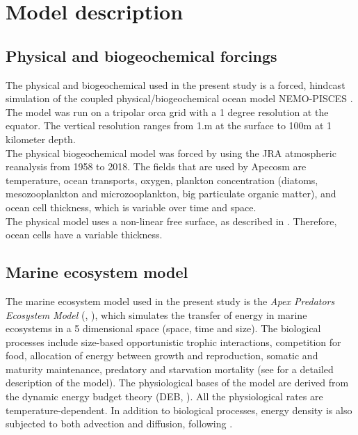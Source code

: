 \section{Model description}

\subsection{Physical and biogeochemical forcings}

The physical and biogeochemical used in the present study is a forced, hindcast simulation of the coupled physical/biogeochemical 
ocean model NEMO-PISCES \citep{aumontPISCESv2OceanBiogeochemical2015}. The model was run on a tripolar orca grid \citep{madecGlobalOceanMesh1996} with a
1 degree resolution at the equator. The vertical resolution ranges from 1.m at the surface to 100m at 1 kilometer depth. \\

The physical biogeochemical model was forced by using the JRA atmospheric reanalysis \citep{kobayashiJRA55ReanalysisGeneral2015} from 1958 to 2018.
The fields that are used by Apecosm are temperature, ocean transports, 
oxygen, plankton concentration (diatoms, mesozooplankton and microzooplankton, big particulate organic matter), 
\ppar and ocean cell thickness, which is variable over time and space.\\

The physical model uses a non-linear free surface, as described in \cite{levierbrunoFreeSurfaceVariable2007}. 
Therefore, ocean cells have a variable thickness. 

\subsection{Marine ecosystem model}

The marine ecosystem model used in the present study is the \emph{Apex Predators Ecosystem Model} (\ap, \citealt{mauryModelingEnvironmentalEffects2007,mauryOverviewAPECOSMSpatialized2010}), which simulates 
the transfer of energy in marine ecosystems in a 5 dimensional space (space, time and size).
The biological processes include size-based opportunistic trophic interactions, competition for food, allocation of energy between growth and reproduction, somatic and maturity maintenance, predatory and starvation mortality (see \citealt{mauryModelingEnvironmentalEffects2007} for a detailed description of the model).
The physiological bases of the model are derived from the dynamic energy budget theory (DEB, \citealt{kooijmanDynamicEnergyMass2000}).
All the physiological rates are temperature-dependent.  In addition to biological processes, energy density 
is also subjected to both advection and diffusion, following \cite{faugerasAdvectiondiffusionreactionSizestructuredFish2005}.\\

